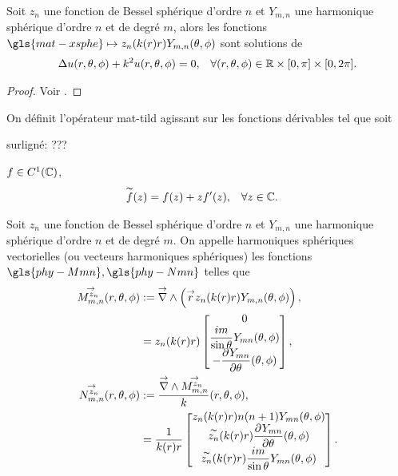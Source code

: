     \begin{prop}
        Soit \(z_n\) une fonction de Bessel sphérique d'ordre \(n\) et \(Y_{m,n}\) une harmonique sphérique d'ordre \(n\) et de degré \(m\), alors les fonctions \(\gls{mat-xsphe} \mapsto z_n(k(r)r)Y_{m,n}(\tp)\) sont solutions de 
        \begin{align*}
            \Delta u(r,\theta,\phi) + k^2u(r,\theta,\phi) = 0, && \forall (r,\theta,\phi) \in \mathbb R\times[0,\pi]\times[0,2\pi].
        \end{align*}
    \end{prop}
    \begin{proof}
        Voir \cite[section.~2.6.1]{nedelec_acoustic_2001}.
    \end{proof}

    \begin{defn}
        On définit l’opérateur \gls{mat-tild} agissant sur les fonctions dérivables tel que soit
\begin{REM}
  surligné: ???
\end{REM}  \(f \in C^1(\mathbb C)\),
        \begin{align*}
        &\overset{\thicksim}{f}(z) = f(z) + zf'(z), && \forall z \in \mathbb C.
        \end{align*}
    \end{defn}

    \begin{defn}
        \label{def:sphere:harmoniques_spheriques_vect}
        Soit \(z_n\) une fonction de Bessel sphérique d'ordre \(n\) et \(Y_{m,n}\) une harmonique sphérique d'ordre \(n\) et de degré \(m\).
        On appelle harmoniques sphériques vectorielles (ou vecteurs harmoniques sphériques) les fonctions \(\gls{phy-Mmn},\gls{phy-Nmn}\) telles que
        \begin{align}
            \label{eq:defMmn}
            \Mmn[z_n](\rtp) &:= \vrot \left( \vect{r} z_n(k(r)r) Y_{m,n}(\tp) \right),
            \\
            \notag&= z_n(k(r)r)
            \begin{bmatrix}
                0
                \\
                \frac{im}{\sin\theta}Y_{mn}(\tp)
                \\
                - \ddr{\theta}{Y_{mn}}(\tp)
            \end{bmatrix},
            \\
            \label{eq:defNnn}
            \Nmn[z_n](\rtp) &:= \frac{\vrot \Mmn[z_n]}{k}(\rtp),
            \\
            \notag&= \frac{1}{k(r)r}\begin{bmatrix}
                z_n(k(r)r)n(n+1)Y_{mn}(\tp)
                \\
                \tilde{z_n}(k(r)r)\ddr{\theta}{Y_{mn}}(\tp)
                \\
                \tilde{z_n}(k(r)r)\frac{im}{\sin\theta}Y_{mn}(\tp)
            \end{bmatrix}.
        \end{align}
    \end{defn}

